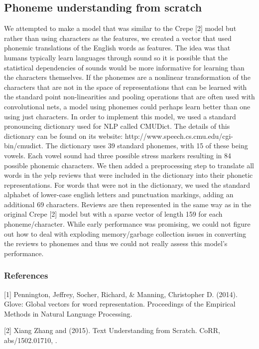 \documentclass{article} %
\begin{document}
\subsection{Phoneme understanding from scratch}
We attempted to make a model that was similar to the Crepe [2] model but rather than using characters as the features, we created a vector that used phonemic translations of the English words as features. The idea was that humans typically learn languages through sound so it is possible that the statistical dependencies of sounds would be more informative for learning than the characters themselves. If the phonemes are a nonlinear transformation of the characters that are not in the space of representations that can be learned with the standard point non-linearities and pooling operations that are often used with convolutional nets, a model using phonemes could perhaps learn better than one using just characters. In order to implement this model, we used a standard pronouncing dictionary used for NLP called CMUDict. The details of this dictionary can be found on its website: http://www.speech.cs.cmu.edu/cgi-bin/cmudict. The dictionary uses 39 standard phonemes, with 15 of these being vowels. Each vowel sound had three possible stress markers resulting in 84 possible phonemic characters. We then added a preprocessing step to translate all words in the yelp reviews that were included in the dictionary into their phonetic representations. For words that were not in the dictionary, we used the standard alphabet of lower-case english letters and punctuation markings, adding an additional 69 characters. Reviews are then represented in the same way as in the original Crepe [2] model but with a sparse vector of length 159 for each phoneme/character. While early performance was promising, we could not figure out how to deal with exploding memory/garbage collection issues in converting the reviews to phonemes and thus we could not really assess this model's performance.

\subsubsection*{References}

\small{

[1] Pennington, Jeffrey, Socher, Richard, \& Manning, Christopher D. (2014). Glove: Global vectors for word representation. Proceedings of the Empirical Methods in Natural Language Processing.

[2] Xiang Zhang and (2015). Text Understanding from Scratch. CoRR, abs/1502.01710, .
}
\end{document}
